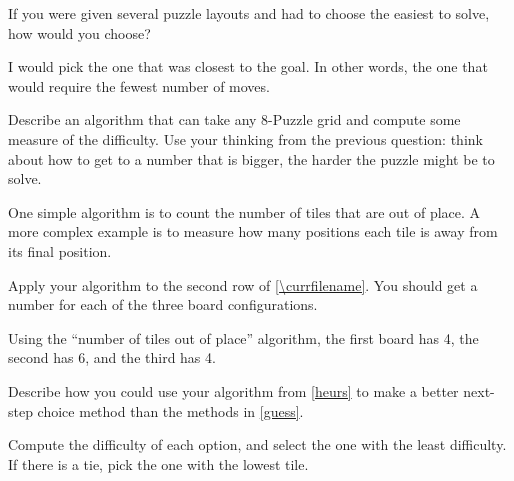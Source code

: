 \Q If you were given several puzzle layouts and had to choose the easiest to solve, how would you choose?

\begin{answer}
I would pick the one that was closest to the goal.
In other words, the one that would require the fewest number of moves.
\end{answer}


\Q \label{heurs} Describe an algorithm that can take any 8-Puzzle grid and compute some measure of the difficulty.
Use your thinking from the previous question: think about how to get to a number that is bigger, the harder the puzzle might be to solve.

\begin{answer}
One simple algorithm is to count the number of tiles that are out of place.
A more complex example is to measure how many positions each tile is away from its final position.
\end{answer}


\Q Apply your algorithm to the second row of \ref{\currfilename}. You should get a number for each of the three board configurations.

\begin{answer}[6em]
Using the ``number of tiles out of place'' algorithm, the first board has 4, the second has 6, and the third has 4.
\end{answer}


\Q Describe how you could use your algorithm from \ref{heurs} to make a better next-step choice method than the methods in \ref{guess}.

\begin{answer}
Compute the difficulty of each option, and select the one with the least difficulty.
If there is a tie, pick the one with the lowest tile.
\end{answer}
